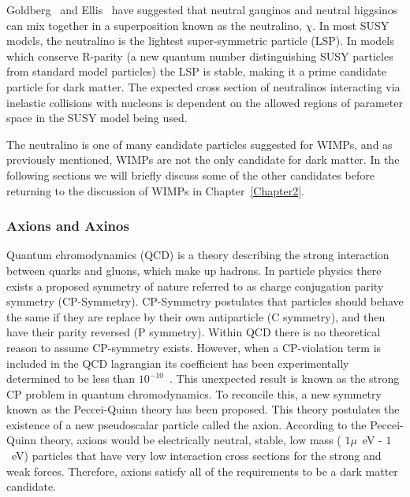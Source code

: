 Goldberg~\cite{Goldberg} and Ellis~\cite{Ellis} have suggested that neutral gauginos and neutral higgsinos can mix together in a superposition known as the neutralino, $\chi$.  In most SUSY models, the neutralino is the lightest super-symmetric particle (LSP).  In models which conserve R-parity (a new quantum number distinguishing SUSY particles from standard model particles) the LSP is stable, making it a prime candidate particle for dark matter.  The expected cross section of neutralinos interacting via inelastic collisions with nucleons is dependent on the allowed regions of parameter space in the SUSY model being used.  

The neutralino is one of many candidate particles suggested for WIMPs, and as previously mentioned, WIMPs are not the only candidate for dark matter.  In the following sections we will briefly discuss some of the other candidates before returning to the discussion of WIMPs in Chapter~\ref{Chapter2}.

\subsubsection{Axions and Axinos}
Quantum chromodynamics (QCD) is a theory describing the strong interaction between quarks and gluons, which make up hadrons.  In particle physics there exists a proposed symmetry of nature referred to as charge conjugation parity symmetry (CP-Symmetry).  CP-Symmetry postulates that particles should behave the same if they are replace by their own antiparticle (C symmetry), and then have their parity reversed (P symmetry). Within QCD there is no theoretical reason to assume CP-symmetry exists.  However, when a CP-violation term is included in the QCD lagrangian its coefficient has been experimentally determined to be less than $10^{-10}$~\cite{Baluni}. This unexpected result is known as the strong CP problem in quantum chromodynamics.    To reconcile this, a new symmetry known as the Peccei-Quinn theory has been proposed.  This theory postulates the existence of a new pseudoscalar particle called the axion.  According to the Peccei-Quinn theory, axions would be electrically neutral, stable, low mass ( $1\mu$~eV - $1$~eV) particles that have very low interaction cross sections for the strong and weak forces. Therefore, axions satisfy all of the requirements to be a dark matter candidate.  

